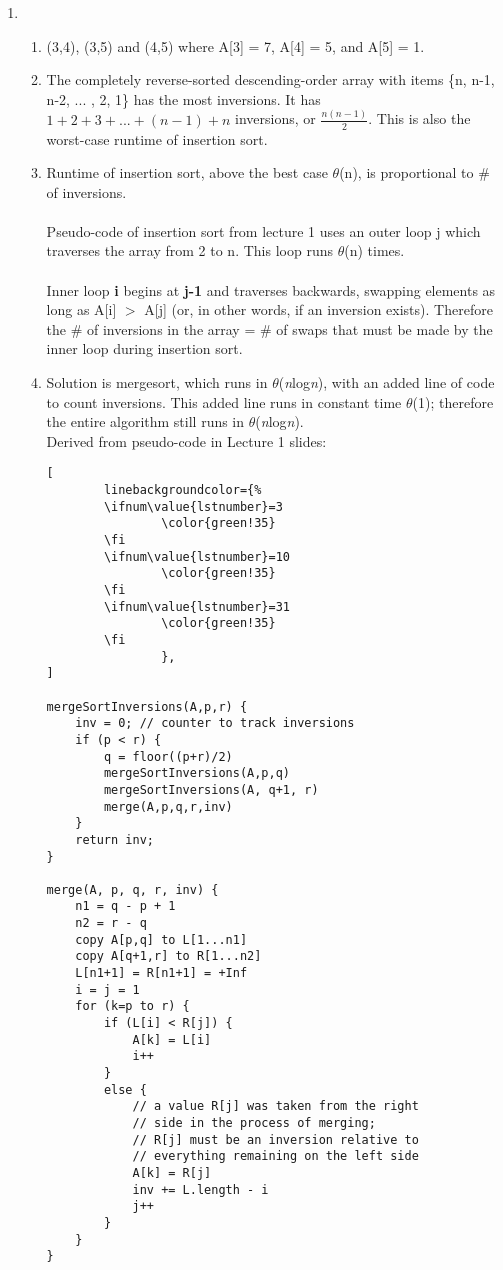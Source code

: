 \documentclass{article}
\begin{document}
\begin{enumerate}
    \item 
    \begin{enumerate}
        \item (3,4), (3,5) and (4,5) where A[3] = 7, A[4] = 5, and A[5] = 1.
        
        \item The completely reverse-sorted descending-order array with items \{n, n-1, n-2, ... , 2, 1\} has the most inversions. It has $1 + 2 + 3 +...+ (n-1) + n$ inversions, or \(\frac{n(n-1)}{2}\). This is also the worst-case runtime of insertion sort.
        
        \item Runtime of insertion sort, above the best case $\theta$(n), is proportional to \# of inversions. \\ \\
        Pseudo-code of insertion sort from lecture 1 uses an outer loop j which traverses the array from 2 to n. This loop runs $\theta$(n) times. \\ \\
        Inner loop \textbf{i} begins at \textbf{j-1} and traverses backwards, swapping elements as long as A[i] $>$ A[j] (or, in other words, if an inversion exists). Therefore the \# of inversions in the array = \# of swaps that must be made by the inner loop during insertion sort. 
        
        \item Solution is mergesort, which runs in $\theta$(\textit{n}log\textit{n}), with an added line of code to count inversions. This added line runs in constant time $\theta$(1); therefore the entire algorithm still runs in $\theta$(\textit{n}log\textit{n}). \\
        \newline
        Derived from pseudo-code in Lecture 1 slides:
        \begin{lstlisting}[
        linebackgroundcolor={%
        \ifnum\value{lstnumber}=3
                \color{green!35}
        \fi
        \ifnum\value{lstnumber}=10
                \color{green!35}
        \fi
        \ifnum\value{lstnumber}=31
                \color{green!35}
        \fi
                },
]

mergeSortInversions(A,p,r) {
    inv = 0; // counter to track inversions
    if (p < r) {
        q = floor((p+r)/2)
        mergeSortInversions(A,p,q)
        mergeSortInversions(A, q+1, r)
        merge(A,p,q,r,inv)
    }
    return inv;
}
            
merge(A, p, q, r, inv) {
    n1 = q - p + 1
    n2 = r - q
    copy A[p,q] to L[1...n1]
    copy A[q+1,r] to R[1...n2]
    L[n1+1] = R[n1+1] = +Inf
    i = j = 1
    for (k=p to r) {
        if (L[i] < R[j]) {
            A[k] = L[i]
            i++
        }
        else {
            // a value R[j] was taken from the right 
            // side in the process of merging;
            // R[j] must be an inversion relative to 
            // everything remaining on the left side
            A[k] = R[j]
            inv += L.length - i
            j++
        }
    }
}
        \end{lstlisting}
    \end{enumerate}
\end{enumerate}
\end{document}
